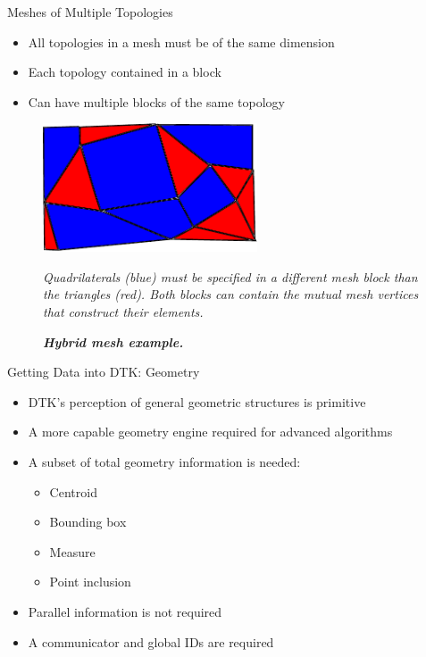 \documentclass{beamer}
\begin{document}
\begin{frame}{Meshes of Multiple Topologies}

  \begin{itemize}
  \item All topologies in a mesh must be of the same dimension
  \item Each topology contained in a block
  \item Can have multiple blocks of the same topology
  \end{itemize}


  \begin{figure}[htpb!]
    \centering \includegraphics[width=2.5in]{hybrid_mesh.pdf}
    \caption{\bf \sl Hybrid mesh example.} {\sl Quadrilaterals (blue)
      must be specified in a different mesh block than the triangles
      (red). Both blocks can contain the mutual mesh vertices that
      construct their elements.}
    \label{fig:hybrid_mesh}
  \end{figure}

\end{frame}

\begin{frame}{Getting Data into DTK: Geometry}
  
  \begin{itemize}
  \item DTK's perception of general geometric structures is primitive
    \medskip
  \item A more capable geometry engine required for advanced
    algorithms
    \medskip
  \item A subset of total geometry information is needed:
    \medskip
    \begin{itemize}
    \item Centroid
    \item Bounding box
    \item Measure
    \item Point inclusion
    \end{itemize}
    \medskip
  \item Parallel information is not required
    \medskip
  \item A communicator and global IDs are required
  \end{itemize}

\end{frame}
\end{document}

